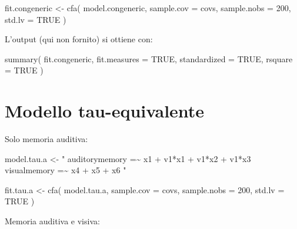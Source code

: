 \documentclass[
  11pt,
]{krantz}
\makeatletter
\newenvironment{Shaded}{\begin{snugshade}}{\end{snugshade}}
\newcommand{\AttributeTok}[1]{\textcolor[rgb]{0.61,0.61,0.61}{#1}}
\newcommand{\ConstantTok}[1]{\textcolor[rgb]{0,0,0}{#1}}
\newcommand{\DecValTok}[1]{\textcolor[rgb]{0.06,0.06,0.06}{#1}}
\newcommand{\FunctionTok}[1]{\textcolor[rgb]{0,0,0}{#1}}
\newcommand{\NormalTok}[1]{#1}
\newcommand{\OtherTok}[1]{\textcolor[rgb]{0.37,0.37,0.37}{#1}}
\newcommand{\StringTok}[1]{\textcolor[rgb]{0.5,0.5,0.5}{#1}}
\newenvironment{kframe}{%
\medskip{}
\setlength{\fboxsep}{.8em}
 \def\at@end@of@kframe{}%
 \ifinner\ifhmode%
  \def\at@end@of@kframe{\end{minipage}}%
  \begin{minipage}{\columnwidth}%
 \fi\fi%
 \def\FrameCommand##1{\hskip\@totalleftmargin \hskip-\fboxsep
 \colorbox{shadecolor}{##1}\hskip-\fboxsep
     \hskip-\linewidth \hskip-\@totalleftmargin \hskip\columnwidth}%
 \MakeFramed {\advance\hsize-\width
   \@totalleftmargin\z@ \linewidth\hsize
   \@setminipage}}%
 {\par\unskip\endMakeFramed%
 \at@end@of@kframe}
\renewenvironment{Shaded}{\begin{kframe}}{\end{kframe}}
\theoremstyle{definition}
\theoremstyle{definition}
\theoremstyle{definition}
\theoremstyle{definition}
\theoremstyle{remark}
\makeatother
\begin{document}
\begin{Shaded}
\begin{Highlighting}[]
\NormalTok{fit.congeneric }\OtherTok{\textless{}{-}} \FunctionTok{cfa}\NormalTok{(}
\NormalTok{  model.congeneric,}
  \AttributeTok{sample.cov =}\NormalTok{ covs,}
  \AttributeTok{sample.nobs =} \DecValTok{200}\NormalTok{,}
  \AttributeTok{std.lv =} \ConstantTok{TRUE}
\NormalTok{)}
\end{Highlighting}
\end{Shaded}

L'output (qui non fornito) si ottiene con:

\begin{Shaded}
\begin{Highlighting}[]
\FunctionTok{summary}\NormalTok{(}
\NormalTok{  fit.congeneric,}
  \AttributeTok{fit.measures =} \ConstantTok{TRUE}\NormalTok{,}
  \AttributeTok{standardized =} \ConstantTok{TRUE}\NormalTok{,}
  \AttributeTok{rsquare =} \ConstantTok{TRUE}
\NormalTok{)}
\end{Highlighting}
\end{Shaded}

\hypertarget{modello-tau-equivalente}{%
\section{Modello tau-equivalente}\label{modello-tau-equivalente}}

Solo memoria auditiva:

\begin{Shaded}
\begin{Highlighting}[]
\NormalTok{model.tau.a }\OtherTok{\textless{}{-}} \StringTok{"}
\StringTok{  auditorymemory =\textasciitilde{} x1 + v1*x1 + v1*x2 + v1*x3}
\StringTok{  visualmemory   =\textasciitilde{} x4 + x5 + x6}
\StringTok{"}
\end{Highlighting}
\end{Shaded}

\begin{Shaded}
\begin{Highlighting}[]
\NormalTok{fit.tau.a }\OtherTok{\textless{}{-}} \FunctionTok{cfa}\NormalTok{(}
\NormalTok{  model.tau.a,}
  \AttributeTok{sample.cov =}\NormalTok{ covs,}
  \AttributeTok{sample.nobs =} \DecValTok{200}\NormalTok{,}
  \AttributeTok{std.lv =} \ConstantTok{TRUE}
\NormalTok{)}
\end{Highlighting}
\end{Shaded}

Memoria auditiva e visiva:
\end{document}
